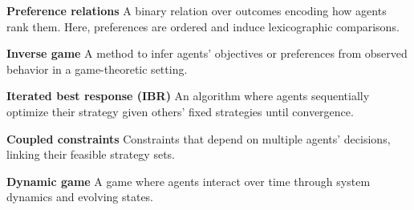 \smallskip \noindent
\textbf{Preference relations} \quad
A binary relation over outcomes encoding how agents rank them. Here, preferences are ordered and induce lexicographic comparisons.

\smallskip \noindent
\textbf{Inverse game} \quad
A method to infer agents' objectives or preferences from observed behavior in a game-theoretic setting.

\smallskip \noindent
\textbf{Iterated best response (IBR)} \quad
An algorithm where agents sequentially optimize their strategy given others' fixed strategies until convergence.

\smallskip \noindent
\textbf{Coupled constraints} \quad
Constraints that depend on multiple agents' decisions, linking their feasible strategy sets.

\smallskip \noindent
\textbf{Dynamic game} \quad
A game where agents interact over time through system dynamics and evolving states.
